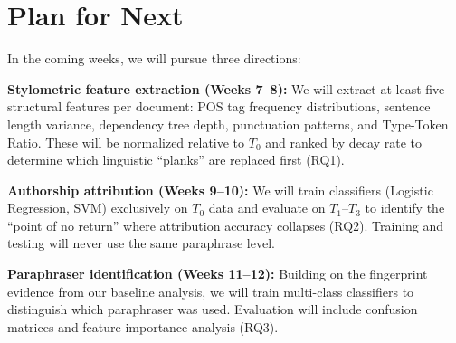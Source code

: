 \section{Plan for Next}

In the coming weeks, we will pursue three directions:

\textbf{Stylometric feature extraction (Weeks 7--8):} We will extract at least five structural features per document: POS tag frequency distributions, sentence length variance, dependency tree depth, punctuation patterns, and Type-Token Ratio. These will be normalized relative to $T_0$ and ranked by decay rate to determine which linguistic ``planks'' are replaced first (RQ1).

\textbf{Authorship attribution (Weeks 9--10):} We will train classifiers (Logistic Regression, SVM) exclusively on $T_0$ data and evaluate on $T_1$--$T_3$ to identify the ``point of no return'' where attribution accuracy collapses (RQ2). Training and testing will never use the same paraphrase level.

\textbf{Paraphraser identification (Weeks 11--12):} Building on the fingerprint evidence from our baseline analysis, we will train multi-class classifiers to distinguish which paraphraser was used. Evaluation will include confusion matrices and feature importance analysis (RQ3).